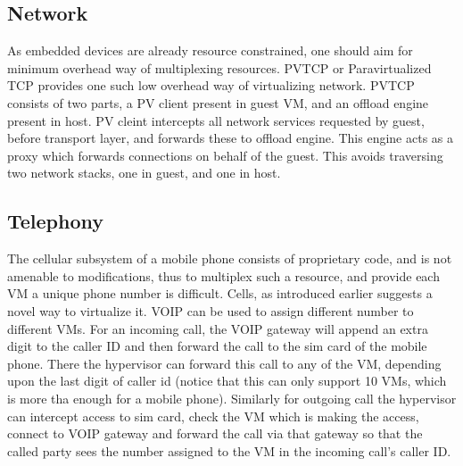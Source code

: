 \documentclass[seminar,twoside]{iitbreport}
\begin{document}
 \subsection*{Network}
 As embedded devices are already resource constrained, one should aim for minimum overhead way of multiplexing resources.
 PVTCP or Paravirtualized TCP provides one such low overhead way of virtualizing network. PVTCP consists of two parts, a PV client present in guest VM, and an offload engine
 present in host. PV cleint intercepts all network services requested by guest, before transport layer, and forwards these to offload engine. This engine acts as a proxy which
 forwards connections on behalf of the guest. This avoids traversing two network stacks, one in guest, and one in host.
 \subsection*{Telephony}
 The cellular subsystem of a mobile phone consists of proprietary code, and is not amenable to modifications, thus to multiplex such a resource, and provide each VM a unique
 phone number is difficult. Cells\cite{Andrus:2011:CVM:2043556.2043574}, as introduced earlier suggests a novel way to virtualize it.
 VOIP can be used to assign different number to different VMs. For an incoming call, the VOIP gateway will append an extra digit to the caller ID and then forward the call to
 the sim card of the mobile phone. There the hypervisor can forward this call to any of the VM, depending upon the last digit of caller id (notice that this can only support 10 VMs, which is more tha enough for a mobile phone). Similarly for outgoing call
 the hypervisor can intercept access to sim card, check the VM which is making the access, connect to VOIP gateway and forward the call via that gateway so that the called party
 sees the number assigned to the VM in the incoming call's caller ID.
\end{document}
